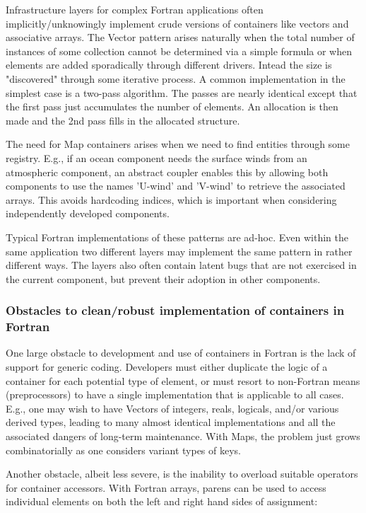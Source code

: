\documentclass{article}
\begin{document}
Infrastructure layers for complex Fortran applications often
implicitly/unknowingly implement crude versions of containers like
vectors and associative arrays.  The Vector pattern arises naturally
when the total number of instances of some collection cannot be
determined via a simple formula or when elements are added
sporadically through different drivers.  Intead the size is
"discovered" through some iterative process.  A common implementation
in the simplest case is a two-pass algorithm.  The passes are nearly
identical except that the first pass just accumulates the number of
elements.  An allocation is then made and the 2nd pass fills in the
allocated structure.

The need for Map containers arises when we need to find entities
through some registry.  E.g., if an ocean component needs the surface
winds from an atmospheric component, an abstract coupler enables this
by allowing both components to use the names 'U-wind' and 'V-wind' to
retrieve the associated arrays.  This avoids hardcoding indices, which
is important when considering independently developed components.

Typical Fortran implementations of these patterns are ad-hoc.  Even
within the same application two different layers may implement the
same pattern in rather different ways.  The layers also often contain
latent bugs that are not exercised in the current component, but
prevent their adoption in other components.


\subsubsection{Obstacles to clean/robust implementation of containers in Fortran}

One large obstacle to development and use of containers in Fortran is
the lack of support for generic coding.  Developers must either
duplicate the logic of a container for each potential type of element,
or must resort to non-Fortran means (preprocessors) to have a single
implementation that is applicable to all cases.  E.g., one may wish to
have Vectors of integers, reals, logicals, and/or various derived
types, leading to many almost identical implementations and all the
associated dangers of long-term maintenance.  With Maps, the problem
just grows combinatorially as one considers variant types of keys.

Another obstacle, albeit less severe, is the inability to overload
suitable operators for container accessors.  With Fortran arrays,
parens can be used to access individual elements on both the left and
right hand sides of assignment:
\end{document}

